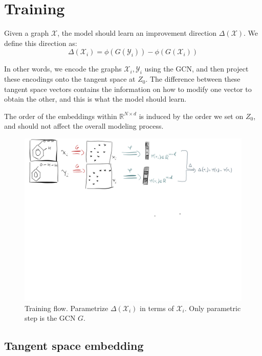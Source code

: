 \documentclass{article}
\begin{document}
\section{Training}
Given a graph $\mathcal{X}$, the model should learn an improvement direction $\Delta(\mathcal{X})$. We define this direction as:
\[\Delta(\mathcal{X}_i) = \phi(G(\mathcal{Y}_i))-\phi(G(\mathcal{X}_i)) \]

In other words, we encode the graphs $\mathcal{X}_i, \mathcal{Y}_i$ using the GCN, and then project these encodings onto the tangent space at $Z_0$. The difference between these tangent space vectors contains the information on how to modify one vector to obtain the other, and this is what the model should learn.

The order of the embeddings within $\mathbb{R}^{N\times d}$ is induced by the order we set on $Z_0$, and should not affect the overall modeling process.

\begin{figure}[h!t]
    \label{fig:train}
    \begin{center}
        \includegraphics[page=2,width=\textwidth, trim=0 40cm 0 0 ,clip,angle=0]{images/model_outline_train.png}
        \caption{Training flow. Parametrize $\Delta(\mathcal{X}_i)$ in terms of $\mathcal{X}_i$. Only parametric step is the GCN $G$.}
    \end{center}
\end{figure}

\subsection{Tangent space embedding}
\end{document}
